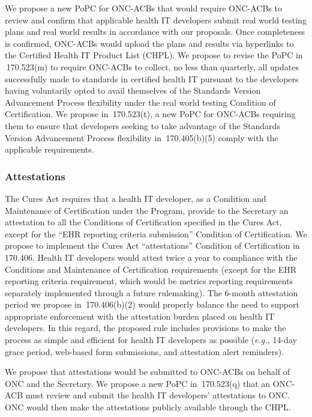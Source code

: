 \documentclass[twoside,11pt]{article}
\begin{document}
          We propose a new PoPC for ONC-ACBs that would require ONC-ACBs to review and confirm that applicable health IT developers submit real world testing plans and real world results in accordance with our proposals. Once  \ifhmode\expandafter\xspace\fi completeness is confirmed, ONC-ACBs would upload the plans and results via hyperlinks to the Certified Health IT Product List (CHPL). We propose to revise the PoPC in \textsection{} 170.523(m) to require ONC-ACBs to collect, no less than quarterly, all updates successfully made to standards in certified health IT pursuant to the developers having voluntarily opted to avail themselves of the Standards Version Advancement Process flexibility under the real world testing Condition of Certification. We propose in \textsection{} 170.523(t), a new PoPC for ONC-ACBs requiring them to ensure that developers seeking to take advantage of the Standards Version Advancement Process flexibility in \textsection{} 170.405(b)(5) comply with the applicable requirements.


          \subsubsection{Attestations}


          The Cures Act requires that a health IT developer, as a Condition and Maintenance of Certification under the Program, provide to the Secretary an attestation to all the Conditions of Certification specified in the Cures Act, except for the “EHR reporting criteria submission” Condition of Certification. We propose to implement the Cures Act “attestations” Condition of Certification in \textsection{} 170.406. Health IT developers would attest twice a year to compliance with the Conditions and Maintenance of Certification requirements (except for the EHR reporting criteria requirement, which would be metrics reporting requirements separately implemented through a future rulemaking). The 6-month attestation period we propose in \textsection{} 170.406(b)(2) would properly balance the need to support appropriate enforcement with the attestation burden placed on health IT developers. In this regard, the proposed rule includes provisions to make the process as simple and efficient for health IT developers as possible (\emph{e.g.,} 14-day grace period, web-based form submissions, and attestation alert reminders).


          We propose that attestations would be submitted to ONC-ACBs on behalf of ONC and the Secretary. We propose a new PoPC in \textsection{} 170.523(q) that an ONC-ACB must review and submit the health IT developers' attestations to ONC. ONC would then make the attestations publicly available through the CHPL.
\end{document}

